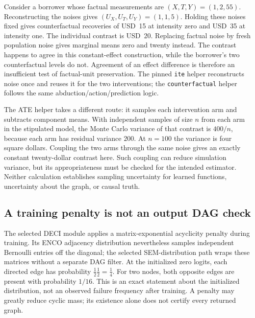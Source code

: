 Consider a borrower whose factual measurements are \((X,T,Y)=(1,2,55)\).
Reconstructing the noises gives \((U_X,U_T,U_Y)=(1,1,5)\). Holding these
noises fixed gives counterfactual
recoveries of USD~15 at intensity zero and USD~35 at intensity one. The
individual contrast is USD~20. Replacing factual noise by fresh population
noise gives marginal means zero and twenty instead. The contrast happens
to agree in this constant-effect construction, while the borrower's two
counterfactual levels do not. Agreement of an effect difference is therefore
an insufficient test of factual-unit preservation. The pinned \texttt{ite}
helper reconstructs noise once and reuses it for the two interventions;
the \texttt{counterfactual} helper follows the same abduction/action/prediction
logic. \citep{exec14_causica_primary,exec14_causica_exact}

The ATE helper takes a different route: it samples each intervention arm and
subtracts component means. With independent samples of size \(n\) from each
arm in the stipulated model, the Monte Carlo variance of that contrast is
\(400/n\), because each arm has residual variance \(200\). At \(n=100\)
the variance is four square dollars. Coupling the two arms through the same
noise gives an exactly constant twenty-dollar contrast here. Such coupling
can reduce simulation variance, but its appropriateness must be checked for
the intended estimator. Neither calculation establishes sampling uncertainty
for learned functions, uncertainty about the graph, or causal truth.
\citep{exec14_causica_exact}

\subsection{A training penalty is not an output DAG check}

The selected DECI module applies a matrix-exponential acyclicity penalty during
training. Its ENCO adjacency distribution nevertheless samples independent
Bernoulli entries off the diagonal; the selected SEM-distribution path wraps
these matrices without a separate DAG filter. At the initialized zero logits,
each directed edge has probability \(\tfrac12\tfrac12=\tfrac14\).
For two nodes, both opposite edges are present with probability
\(1/16\). This is an exact statement about the initialized distribution,
not an observed failure frequency after training. A penalty may greatly
reduce cyclic mass; its existence alone does not certify every returned
graph. \citep{exec14_causica_primary,exec14_causica_exact}

